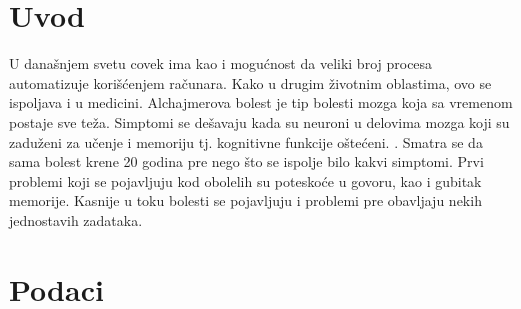 \documentclass[12pt,oneside]{memoir}
\begin{document}
\frontmatter
\naslovna
\komisija
\tableofcontents*

\mainmatter


\chapter{Uvod}

U današnjem svetu covek ima kao i mogućnost da veliki broj procesa automatizuje korišćenjem računara.  Kako u drugim životnim oblastima,  ovo se ispoljava i u medicini.  Alchajmerova bolest je tip bolesti mozga koja sa vremenom postaje sve teža.  Simptomi se dešavaju kada su neuroni u delovima mozga koji su zaduženi za učenje i memoriju tj. kognitivne funkcije oštećeni. \cite{Alzheimer_facts_figures}. Smatra se da sama bolest krene 20 godina pre nego što se ispolje bilo kakvi simptomi.  Prvi problemi koji se pojavljuju kod obolelih su poteskoće u govoru, kao i gubitak memorije.  Kasnije u toku bolesti se pojavljuju i problemi pre obavljaju nekih jednostavih zadataka. 


\chapter{Podaci}
\end{document}
